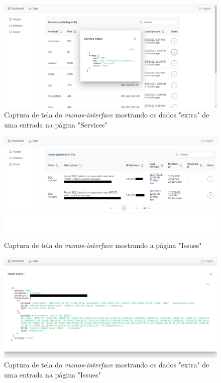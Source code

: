 \begin{figure}[H]
    \includegraphics[scale=0.32]{figuras/vumos-interface-service-extra.png}
    \caption{Captura de tela do \textit{vumos-interface} mostrando os dados "extra" de uma entrada na página "Services"}
\end{figure}

\begin{figure}[H]
    \includegraphics[scale=0.32]{figuras/vumos-interface-issues.png}
    \caption{Captura de tela do \textit{vumos-interface} mostrando a página "Issues"}
\end{figure}


\begin{figure}[H]
    \includegraphics[scale=0.32]{figuras/vumos-interface-issue-extra.png}
    \caption{Captura de tela do \textit{vumos-interface} mostrando os dados "extra" de uma entrada na página "Issues"}
\end{figure}